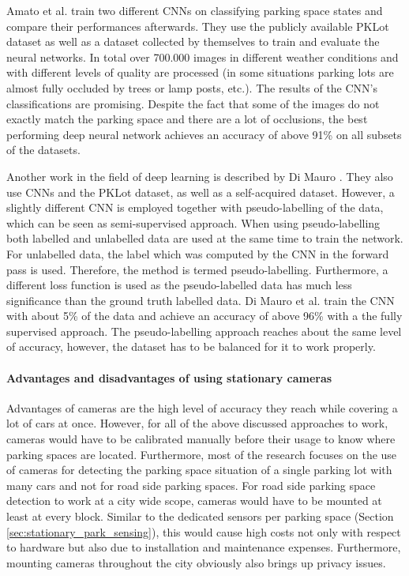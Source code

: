 Amato et al. \cite{Amato2016} train two different CNNs on classifying parking space states and compare their performances afterwards. They use the publicly available PKLot dataset as well as a dataset collected by themselves to train and evaluate the neural networks. In total over 700.000 images in different weather conditions and with different levels of quality are processed (in some situations parking lots are almost fully occluded by trees or lamp posts, etc.). The results of the CNN's classifications are promising. Despite the fact that some of the images do not exactly match the parking space and there are a lot of occlusions, the best performing deep neural network achieves an accuracy of above 91\% on all subsets of the datasets.

Another work in the field of deep learning is described by Di Mauro \cite{DiMauro2016}. They also use CNNs and the PKLot dataset, as well as a self-acquired dataset. However, a slightly different CNN is employed together with pseudo-labelling of the data, which can be seen as semi-supervised approach. When using pseudo-labelling both labelled and unlabelled data are used at the same time to train the network. For unlabelled data, the label which was computed by the CNN in the forward pass is used. Therefore, the method is termed pseudo-labelling. Furthermore, a different loss function is used as the pseudo-labelled data has much less significance than the ground truth labelled data. Di Mauro et al. train the CNN with about 5\% of the data and achieve an accuracy of above 96\% with a the fully supervised approach. The pseudo-labelling approach reaches about the same level of accuracy, however, the dataset has to be balanced for it to work properly.


\paragraph{Advantages and disadvantages of using stationary cameras}

Advantages of cameras are the high level of accuracy they reach while covering a lot of cars at once. However, for all of the above discussed approaches to work, cameras would have to be calibrated manually before their usage to know where parking spaces are located. Furthermore, most of the research focuses on the use of cameras for detecting the parking space situation of a single parking lot with many cars and not for road side parking spaces. For road side parking space detection to work at a city wide scope, cameras would have to be mounted at least at every block. Similar to the dedicated sensors per parking space (Section \ref{sec:stationary_park_sensing}), this would cause high costs not only with respect to hardware but also due to installation and maintenance expenses. Furthermore, mounting cameras throughout the city obviously also brings up privacy issues.





